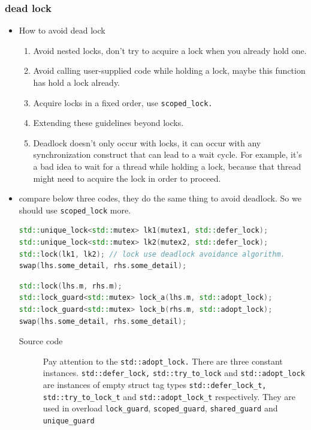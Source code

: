 \documentclass[a4paper,11pt,twoside]{book}
\begin{document}
\subsubsection{dead lock}

\begin{itemize}
	
	\item How to avoid dead lock
	\begin{enumerate}
		\item Avoid nested locks, don't try to acquire a lock when you already hold one.
		\item Avoid calling user-supplied code while holding a lock, maybe this function has hold a lock already.
		\item Acquire locks in a fixed order, use \texttt{scoped\_lock.}
		\item Extending these guidelines beyond locks. 
		\item Deadlock doesn't only occur with locks, it can occur with any synchronization construct that can lead to a wait cycle. For example, it's a bad idea to wait for a thread while holding a lock, because that thread might need to acquire the lock in order to proceed. 
	\end{enumerate}	

	\item compare below three codes, they do the same thing to avoid deadlock. So we should use \texttt{scoped\_lock} more. 
\begin{lstlisting}[frame=single, language=c++]
std::unique_lock<std::mutex> lk1(mutex1, std::defer_lock);
std::unique_lock<std::mutex> lk2(mutex2, std::defer_lock);
std::lock(lk1, lk2); // lock use deadlock avoidance algorithm. 
swap(lhs.some_detail, rhs.some_detail);	
\end{lstlisting}

\begin{lstlisting}[frame=single, language=c++]
std::lock(lhs.m, rhs.m);
std::lock_guard<std::mutex> lock_a(lhs.m, std::adopt_lock);
std::lock_guard<std::mutex> lock_b(rhs.m, std::adopt_lock);
swap(lhs.some_detail, rhs.some_detail);	
\end{lstlisting}
\begin{description}
	\item[Source code] Pay attention to the \texttt{std::adopt\_lock.} There are three constant instances. \texttt{std::defer\_lock,} \texttt{std::try\_to\_lock} and \texttt{std::adopt\_lock} are instances of empty struct tag types \texttt{std::defer\_lock\_t,} \texttt{std::try\_to\_lock\_t} and \texttt{std::adopt\_lock\_t} respectively. They are used in overload \texttt{lock\_guard}, \texttt{scoped\_guard}, \texttt{shared\_guard} and \texttt{unique\_guard}
\end{description}



\end{itemize}
\end{document}
